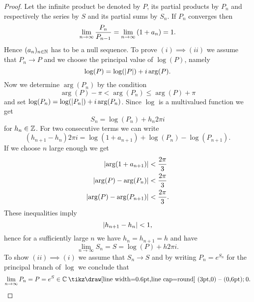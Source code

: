 \begin{proof}
	Let the infinite product be denoted by $P$, its partial products by $P_n$ and respectively the series by $S$ and its partial sums by $S_n$. If $P_n$ converges then
\begin{equation*}
	\lim\limits_{n \to \infty} \frac{P_n}{P_{n - 1}} = \lim\limits_{n \to \infty} \left(1 + a_n\right) = 1.
\end{equation*}
	Hence $(a_n)_{n \in \mathbb{N}}$ has to be a null sequence. To prove $(i) \implies (ii)$ we assume that $P_n \to P$ and we choose the principal value of $\log(P)$, namely
\begin{equation*}
	\log(P) = \log(\left|P\right|) + i \arg(P).
\end{equation*}
	Now we determine $\arg(P_n)$ by the condition
\begin{equation*}	
	\arg(P) - \pi < \arg(P_n) \leq \arg(P) + \pi
\end{equation*}
	and set $\log(P_n) = \log(\left|P_n\right|) + i \arg(P_n)$. Since $\log$ is a multivalued function we get
\begin{equation*}
	S_n = \log(P_n) + h_n 2 \pi i
\end{equation*}
	for $h_n \in \mathbb{Z}$. For two consecutive terms we can write
\begin{equation*}
	(h_{n + 1} - h_n) 2 \pi i = \log(1 + a_{n + 1}) + \log(P_n) - \log(P_{n + 1}).
\end{equation*}
	If we choose $n$ large enough we get
\begin{equation*}
\begin{aligned}
	\left|\arg(1 + a_{n + 1})\right| &< \frac{2 \pi}{3} \\
	\left|\arg(P) - \arg(P_n)\right| &< \frac{2 \pi}{3} \\
	\left|\arg(P) - \arg(P_{n + 1})\right| &< \frac{2 \pi}{3}.
\end{aligned}
\end{equation*}
	These inequalities imply
\begin{equation*}
	\left|h_{n + 1} - h_n\right| < 1,
\end{equation*}
	hence for a sufficiently large $n$ we have $h_n = h_{n + 1} = h$ and have
\begin{equation*}
	\lim\limits_{n \to \infty} S_n = S = \log(P) + h 2 \pi i.
\end{equation*}
	To show $(ii) \implies (i)$ we assume that $S_n \to S$ and by writing $P_n = e^{S_n}$ for the principal branch of $\log$ we conclude that
\begin{equation*}
	\lim\limits_{n \to \infty} P_n = P = e^{S} \in \field{C} \mysetminus {0}.
\end{equation*}
\end{proof}


